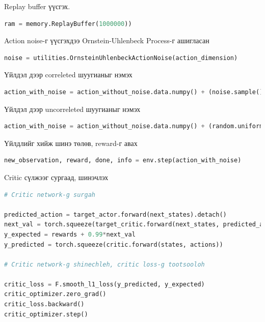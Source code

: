 \documentclass[12pt,A4]{report}
\begin{document}
Replay buffer үүсгэх.

\begin{lstlisting}[language=Python, caption=Replay buffer үүсгэх, frame=single]
ram = memory.ReplayBuffer(1000000))
\end{lstlisting}

Action noise-г үүсгэхдээ Ornstein-Uhlenbeck Process-г ашигласан

\begin{lstlisting}[language=Python, caption=Шуугиан үүсгэх, frame=single]
noise = utilities.OrnsteinUhlenbeckActionNoise(action_dimension)
\end{lstlisting}

Үйлдэл дээр correleted шуугианыг нэмэх

\begin{lstlisting}[language=Python, caption=Үйлдэл дээр шуугиан нэмэх, frame=single]
action_with_noise = action_without_noise.data.numpy() + (noise.sample() * action_max)
\end{lstlisting}

Үйлдэл дээр uncorreleted шуугианыг нэмэх

\begin{lstlisting}[language=Python, caption=Үйлдэл дээр шуугиан нэмэх, frame=single]
action_with_noise = action_without_noise.data.numpy() + (random.uniform(-0.2, 0.2) * action_max)
\end{lstlisting}

Үйлдлийг хийж шинэ төлөв, reward-г авах

\begin{lstlisting}[language=Python, caption=Үйлдэл хийх, frame=single]
new_observation, reward, done, info = env.step(action_with_noise)
\end{lstlisting}

Critic сүлжээг сургаад, шинэчлэх

\begin{lstlisting}[language=Python, caption=Critic сүлжээг сургах шинэчлэх, frame=single]
# Critic network-g surgah

predicted_action = target_actor.forward(next_states).detach()
next_val = torch.squeeze(target_critic.forward(next_states, predicted_action).detach())
y_expected = rewards + 0.99*next_val
y_predicted = torch.squeeze(critic.forward(states, actions))

# Critic network-g shinechleh, critic loss-g tootsooloh
            
critic_loss = F.smooth_l1_loss(y_predicted, y_expected)
critic_optimizer.zero_grad()
critic_loss.backward()
critic_optimizer.step()
\end{lstlisting}	
\end{document}
